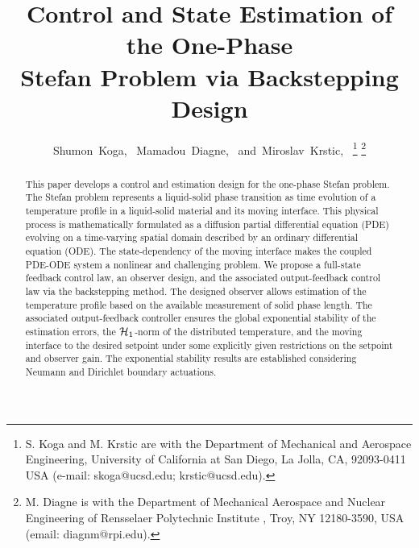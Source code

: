 \documentclass[journal]{IEEEtran}
\begin{document}
\setlength\abovedisplayskip{8pt}
\setlength\belowdisplayskip{8pt}
\setlength\abovedisplayshortskip{8pt}
\setlength\belowdisplayshortskip{8pt}
 
\allowdisplaybreaks
 
\setlength{\parindent}{1em}
\setlength{\parskip}{0em}
\title{Control and State Estimation of the One-Phase \\Stefan Problem via Backstepping Design}

\author{Shumon~Koga,~
        Mamadou~Diagne,~
        and~Miroslav~Krstic,~
\thanks{S. Koga and M. Krstic are with the Department
of Mechanical and Aerospace Engineering, University of California at San Diego, La Jolla,
CA, 92093-0411 USA (e-mail: skoga@ucsd.edu; krstic@ucsd.edu).}
\thanks{M. Diagne is with the Department of Mechanical Aerospace and Nuclear Engineering of Rensselaer Polytechnic Institute , Troy, NY 12180-3590, USA (email: diagnm@rpi.edu).}}

\maketitle

\begin{abstract}
This paper develops a control and estimation design for the one-phase Stefan problem. The Stefan problem represents a liquid-solid phase transition as time evolution of a temperature profile in a liquid-solid material and its moving interface. This physical process is mathematically formulated as a diffusion partial differential equation (PDE) evolving on a time-varying spatial domain described by an ordinary differential equation (ODE). The state-dependency of the moving interface makes the coupled PDE-ODE system a nonlinear and challenging problem. We propose a full-state feedback control law, an observer design, and the associated output-feedback control law via the backstepping method. The designed observer allows estimation of the temperature profile based on the available measurement of solid phase length. The associated output-feedback controller ensures the global exponential stability of the estimation errors, the ${\cal H}_1$-norm of the distributed temperature, and the moving interface to the desired setpoint under some explicitly given restrictions on the setpoint and observer gain.  The exponential stability results are established considering Neumann and Dirichlet boundary actuations.
\end{abstract}
\end{document}
